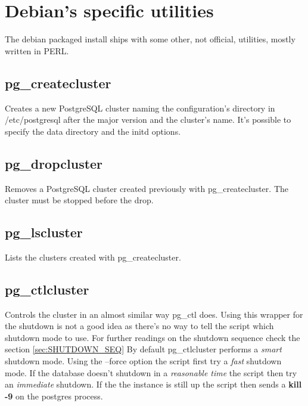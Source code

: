 \section{Debian's specific utilities}
The debian packaged install ships with some other, not official, utilities, mostly written in PERL.

\subsection{pg\_createcluster}
Creates a new PostgreSQL cluster naming the configuration's directory in /etc/postgresql after the
major version and the cluster's name. 
It's possible to specify the data directory and the initd options.

\subsection{pg\_dropcluster}
Removes a PostgreSQL cluster created previously with pg\_createcluster. The cluster must be stopped before the drop.


\subsection{pg\_lscluster}
Lists the clusters created with pg\_createcluster.

\subsection{pg\_ctlcluster}
\label{sub:PGCTLDEB}
Controls the cluster in an almost similar way pg\_ctl does. 
Using this wrapper for the shutdown is not a good idea as there's no way to tell 
the script which shutdown mode to use. For further readings on the shutdown 
sequence check the section \ref{sec:SHUTDOWN_SEQ} 
By default pg\_ctlcluster performs a \textit{smart} shutdown mode.
Using the --force option the script first try a \textit{fast} shutdown mode.
If the database doesn't shutdown in a \textit{reasonable time} the script then try an \textit{immediate} shutdown.
If the the instance is still up the script then sends a \textbf{kill -9} on the postgres process.

